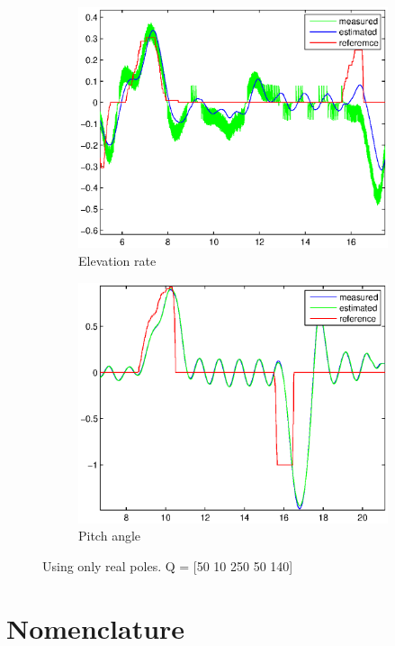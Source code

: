 \begin{figure}[H]
\graphicspath{ {Part4_pictures/}}
\begin{subfigure}{0.5\textwidth}
    \includegraphics[width=0.9\linewidth]{Part4_pictures/p4p2_int/PID_reg_p8_elevation.eps} 
    \caption{Elevation rate}
    \label{fig:p4p2intP6e}
\end{subfigure}
\begin{subfigure}{0.5\textwidth}
    \includegraphics[width=0.9\linewidth]{Part4_pictures/p4p2_int/PID_reg_p8_pitch.eps}
    \caption{Pitch angle}
    \label{fig:p4p2intP6p}
\end{subfigure}
\caption{Using only real poles. Q = [50 10 250 50 140]}
\label{p4p2intP6}
\end{figure}
\newpage

\section{Nomenclature}%

